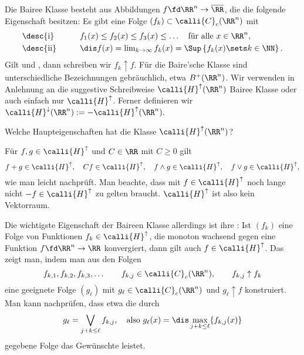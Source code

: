 \begin{antwort}
  Die Baire\sch e Klasse besteht aus Abbildungen $f\fd \RR^n\to \overline{\RR}$, die 
  die folgende Eigenschaft besitzen: 
  Es gibt eine Folge $(f_k)\subset \calli{C}_c ( \RR^n ) $ mit  
  \[
  \begin{array}{lp{3mm}l}
    \text{\desc{i}} & & 
    f_1(x) \le f_2(x) \le f_3(x) \le \ldots \quad 
    \text{f\"ur alle $x\in\RR^n$}, \\[1mm]
    \text{\desc{ii}} & & 
    \dis f(x)=\lim_{k\to\infty} f_k(x) = 
    \Sup \left\{ f_k (x)\sets k\in\NN \right\}.
  \end{array}
  \]
  Gilt  und , dann schreiben wir $f_k \uparrow f$. 
  Für die Baire'sche Klasse sind unterschiedliche Bezeichnungen gebräuchlich,
  etwa $B^+ ( \RR^n )$. Wir verwenden in Anlehnung an \citep{Forster} 
  die suggestive Schreibweise 
  $\calli{H}^{\uparrow}(\RR^n)$ 
  {Baire\sch e Klasse}
  oder auch einfach nur $\calli{H}^{\uparrow}$. Ferner definieren wir 
  $\calli{H}^{\downarrow}( \RR^n ) := - \calli{H}^{\uparrow}( \RR^n ).$ \AntEnd
\end{antwort}

\begin{frage}\label{11_heig}
  Welche Haupteigenschaften hat die Klasse $\calli{H}^{\uparrow} (\RR^n)$?
\end{frage}

\begin{antwort}
  F\"ur $f,g \in \calli{H}^{\uparrow}$ und $C\in \RR$ mit $C\ge 0$ gilt 
  \[
  f+g \in \calli{H}^{\uparrow},\quad
  Cf \in \calli{H}^{\uparrow},\quad 
  f\wedge g \in \calli{H}^{\uparrow},\quad
  f\vee g \in \calli{H}^{\uparrow}, 
  \]
  wie man leicht nachpr\"uft. 
  Man beachte, dass mit $f\in \calli{H}^\uparrow$ noch lange 
  nicht $-f \in \calli{H}^\uparrow $ zu gelten braucht. 
  $\calli{H}^\uparrow$ ist also kein Vektorraum. 



  Die wichtigste Eigenschaft der Baire\sch en Klasse allerdings ist ihre  
  : Ist 
  $(f_k)$ eine Folge von Funktionen $f_k \in \calli{H}^{\uparrow}$, 
  die monoton wachsend gegen eine Funktion $f\fd \RR^n \to\RR$ konvergiert, 
  dann gilt auch $f\in \calli{H}^{\uparrow}$. Das zeigt man, 
  indem man aus den Folgen 
  \[
  f_{k,1},f_{k,2}, f_{k,3},\ldots 
  \qquad f_{k,j}\in \calli{C}_c(\RR^n), \qquad f_{k,j}\uparrow f_k
  \]
  eine geeignete Folge $(g_\ell)$ mit $g_\ell \in \calli{C}_c (\RR^n)$ und 
  $g_\ell \uparrow f$ konstruiert. Man kann nachprüfen, dass etwa die durch 
  \[
  g_{\ell} = \bigvee_{j+k\le \ell} f_{k,j}, \quad 
  \text{also $g_\ell(x)=\dis\max_{j+k\le \ell} \{ f_{k,j}(x) \}$}
  \]
  gegebene Folge das Gewünschte leistet.
  \AntEnd
\end{antwort}

